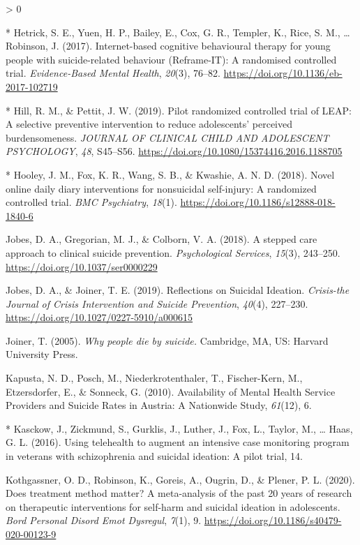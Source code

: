 \documentclass[
  english,
  man]{apa6}
\newlength{\cslhangindent}
\newenvironment{CSLReferences}[2] %
 {%
  \setlength{\parindent}{0pt}
  \ifodd #1 \everypar{\setlength{\hangindent}{\cslhangindent}}\ignorespaces\fi
  \ifnum #2 > 0
  \setlength{\parskip}{#2\baselineskip}
  \fi
 }%
 {}
\begin{document}
\begin{CSLReferences}{1}{0}
\leavevmode\hypertarget{ref-hetrick2017}{}%
* Hetrick, S. E., Yuen, H. P., Bailey, E., Cox, G. R., Templer, K., Rice, S. M., \ldots{} Robinson, J. (2017). Internet-based cognitive behavioural therapy for young people with suicide-related behaviour ({Reframe}-{IT}): A randomised controlled trial. \emph{Evidence-Based Mental Health}, \emph{20}(3), 76--82. \url{https://doi.org/10.1136/eb-2017-102719}

\leavevmode\hypertarget{ref-hill2019}{}%
* Hill, R. M., \& Pettit, J. W. (2019). Pilot randomized controlled trial of {LEAP}: A selective preventive intervention to reduce adolescents' perceived burdensomeness. \emph{JOURNAL OF CLINICAL CHILD AND ADOLESCENT PSYCHOLOGY}, \emph{48}, S45--S56. \url{https://doi.org/10.1080/15374416.2016.1188705}

\leavevmode\hypertarget{ref-hooley2018}{}%
* Hooley, J. M., Fox, K. R., Wang, S. B., \& Kwashie, A. N. D. (2018). Novel online daily diary interventions for nonsuicidal self-injury: A randomized controlled trial. \emph{BMC Psychiatry}, \emph{18}(1). \url{https://doi.org/10.1186/s12888-018-1840-6}

\leavevmode\hypertarget{ref-jobes2018}{}%
Jobes, D. A., Gregorian, M. J., \& Colborn, V. A. (2018). A stepped care approach to clinical suicide prevention. \emph{Psychological Services}, \emph{15}(3), 243--250. \url{https://doi.org/10.1037/ser0000229}

\leavevmode\hypertarget{ref-jobes2019}{}%
Jobes, D. A., \& Joiner, T. E. (2019). Reflections on {Suicidal Ideation}. \emph{Crisis-the Journal of Crisis Intervention and Suicide Prevention}, \emph{40}(4), 227--230. \url{https://doi.org/10.1027/0227-5910/a000615}

\leavevmode\hypertarget{ref-joiner2005}{}%
Joiner, T. (2005). \emph{Why people die by suicide.} {Cambridge, MA, US}: {Harvard University Press}.

\leavevmode\hypertarget{ref-kapusta2010}{}%
Kapusta, N. D., Posch, M., Niederkrotenthaler, T., Fischer-Kern, M., Etzersdorfer, E., \& Sonneck, G. (2010). Availability of {Mental Health Service Providers} and {Suicide Rates} in {Austria}: A {Nationwide Study}, \emph{61}(12), 6.

\leavevmode\hypertarget{ref-kasckow2016}{}%
* Kasckow, J., Zickmund, S., Gurklis, J., Luther, J., Fox, L., Taylor, M., \ldots{} Haas, G. L. (2016). Using telehealth to augment an intensive case monitoring program in veterans with schizophrenia and suicidal ideation: A pilot trial, 14.

\leavevmode\hypertarget{ref-kothgassner2020}{}%
Kothgassner, O. D., Robinson, K., Goreis, A., Ougrin, D., \& Plener, P. L. (2020). Does treatment method matter? A meta-analysis of the past 20 years of research on therapeutic interventions for self-harm and suicidal ideation in adolescents. \emph{Bord Personal Disord Emot Dysregul}, \emph{7}(1), 9. \url{https://doi.org/10.1186/s40479-020-00123-9}


\end{CSLReferences}
\end{document}
